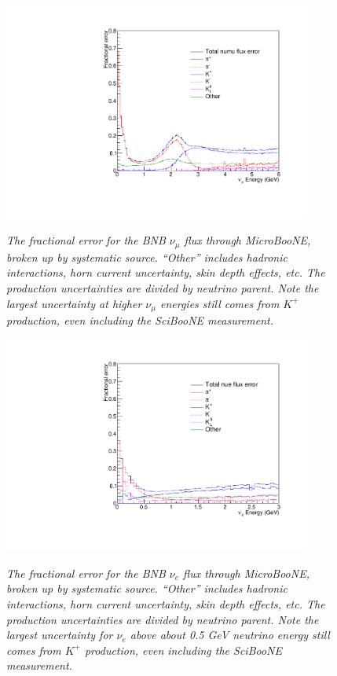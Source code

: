 \begin{figure}[ht!]
\centering
	\includegraphics[width=0.9\textwidth]{Figures/UB_numu_fluxerr.pdf} \\
\caption{\textit{The fractional error for the BNB $\nu_\mu$ flux through MicroBooNE, broken up by systematic source. ``Other'' includes hadronic interactions, horn current uncertainty, skin depth effects, etc. The production uncertainties are divided by neutrino parent. Note the largest uncertainty at higher $\nu_\mu$ energies still comes from $K^+$ production, even including the SciBooNE measurement.}}\label{UB_numu_fluxerror_fig}
\end{figure}

\begin{figure}[ht!]
\centering
	\includegraphics[width=0.9\textwidth]{Figures/UB_nue_fluxerr.pdf} \\
\caption{\textit{The fractional error for the BNB $\nu_e$ flux through MicroBooNE, broken up by systematic source. ``Other'' includes hadronic interactions, horn current uncertainty, skin depth effects, etc. The production uncertainties are divided by neutrino parent. Note the largest uncertainty for $\nu_e$ above about 0.5 GeV neutrino energy still comes from $K^+$ production, even including the SciBooNE measurement.}}\label{UB_nue_fluxerror_fig}
\end{figure}

